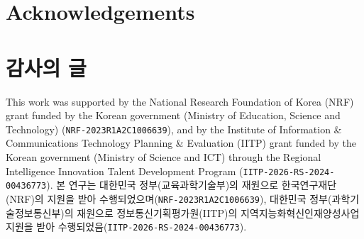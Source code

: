 \documentclass[9pt,twocolumn]{extarticle}
\begin{document}
\noindent\begin{minipage}{\columnwidth}
\ifdefined\kieepublication
\section*{Acknowledgements}
\else
\section*{감사의 글}
\fi
\begingroup
\raggedright
\ifdefined\kieepublication
This work was supported by the National Research Foundation of Korea (NRF) grant funded by the Korean government (Ministry of Education, Science and Technology) (\nolinkurl{NRF-2023R1A2C1006639}), and by the Institute of Information \& Communications Technology Planning \& Evaluation (IITP) grant funded by the Korean government (Ministry of Science and ICT) through the Regional Intelligence Innovation Talent Development Program (\nolinkurl{IITP-2026-RS-2024-00436773}).
\else
본 연구는 대한민국 정부(교육과학기술부)의 재원으로 한국연구재단(NRF)의 지원을 받아 수행되었으며(\nolinkurl{NRF-2023R1A2C1006639}), 대한민국 정부(과학기술정보통신부)의 재원으로 정보통신기획평가원(IITP)의 지역지능화혁신인재양성사업 지원을 받아 수행되었음(\nolinkurl{IITP-2026-RS-2024-00436773}).
\fi
\par
\endgroup
\end{minipage}

\ifdefined\kieepublication

\else

\fi
\begingroup
\fontsize{8pt}{12pt}\selectfont

\endgroup
\ifdefined\kieepublication

\fi
\end{document}
